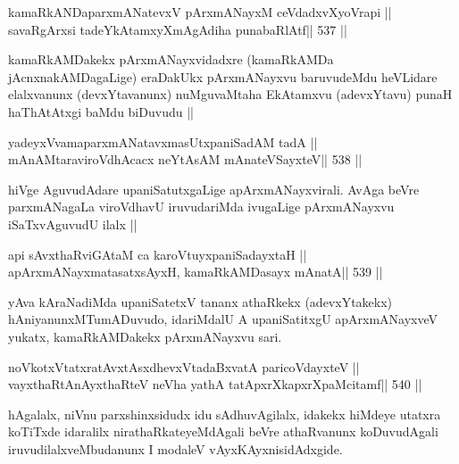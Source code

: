 

\begin{shl}
kamaRkANDaparxmANatevxV pArxmANayxM ceVdadxvXyoVrapi ||
savaRgArxsi tadeYkAtamxyXmAgAdiha punabaRlAtf\hfill || 537 ||
\end{shl}

\begin{artha}
kamaRkAMDakekx pArxmANayxvidadxre (kamaRkAMDa jAcnxnakAMDagaLige)
eraDakUkx pArxmANayxvu baruvudeMdu heVLidare elalxvanunx
(devxYtavanunx) nuMguvaMtaha EkAtamxvu (adevxYtavu) punaH haThAtAtxgi
baMdu biDuvudu ||
\end{artha} 



\begin{shl}
yadeyxVvamaparxmANatavxmasUtxpaniSadAM tadA ||
mAnAMtaraviroVdhAcacx neYtAsAM mAnateVSayxteV\hfill || 538 ||
\end{shl}

\begin{artha}
hiVge AguvudAdare upaniSatutxgaLige apArxmANayxvirali. AvAga beVre
parxmANagaLa viroVdhavU iruvudariMda ivugaLige pArxmANayxvu
iSaTxvAguvudU ilalx ||
\end{artha}

\begin{shl}
api sAvxthaRviGAtaM ca karoVtuyxpaniSadayxtaH ||
apArxmANayxmatasatxsAyxH, kamaRkAMDasayx mAnatA\hfill || 539 ||
\end{shl}

\begin{artha}
yAva kAraNadiMda upaniSatetxV tananx athaRkekx (adevxYtakekx)
hAniyanunxMTumADuvudo, idariMdalU A upaniSatitxgU apArxmANayxveV
yukatx, kamaRkAMDakekx pArxmANayxvu sari.
\end{artha}


\begin{shl}
noVkotxVtatxratAvxtAsxdhevxVtadaBxvatA paricoVdayxteV ||
vayxthaRtAnAyxthaRteV neVha yathA tatApxrXkapxrXpaMcitamf\hfill || 540 ||
\end{shl}

\begin{artha}
hAgalalx, niVnu parxshinxsidudx idu sAdhuvAgilalx, idakekx hiMdeye
utatxra koTiTxde idaralilx nirathaRkateyeMdAgali beVre athaRvanunx
koDuvudAgali iruvudilalxveMbudanunx I modaleV vAyxKAyxnisidAdxgide.
\end{artha}

